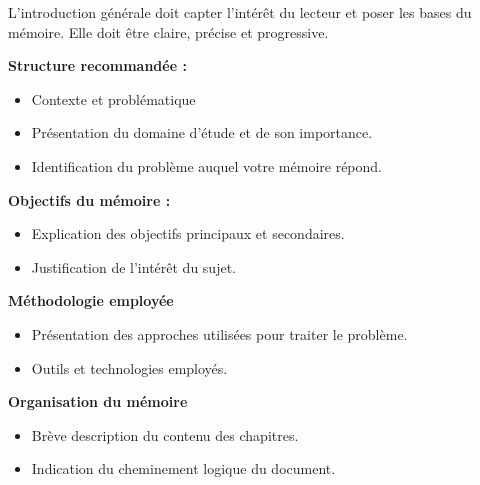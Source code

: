 \IntroductionGenerale


L’introduction générale doit capter l’intérêt du lecteur et poser les bases du mémoire. Elle doit être claire, précise et progressive.

\textbf{Structure recommandée :}
\begin{itemize}
	\item Contexte et problématique
	\item Présentation du domaine d’étude et de son importance.
	\item Identification du problème auquel votre mémoire répond.
\end{itemize}

\textbf{Objectifs du mémoire :}

\begin{itemize}
	\item Explication des objectifs principaux et secondaires.
	\item Justification de l’intérêt du sujet.
\end{itemize}

\textbf{Méthodologie employée}

\begin{itemize}
	\item Présentation des approches utilisées pour traiter le problème.
	\item Outils et technologies employés.
\end{itemize}

\textbf{Organisation du mémoire}

\begin{itemize}
	\item Brève description du contenu des chapitres.
	\item Indication du cheminement logique du document.
\end{itemize}

